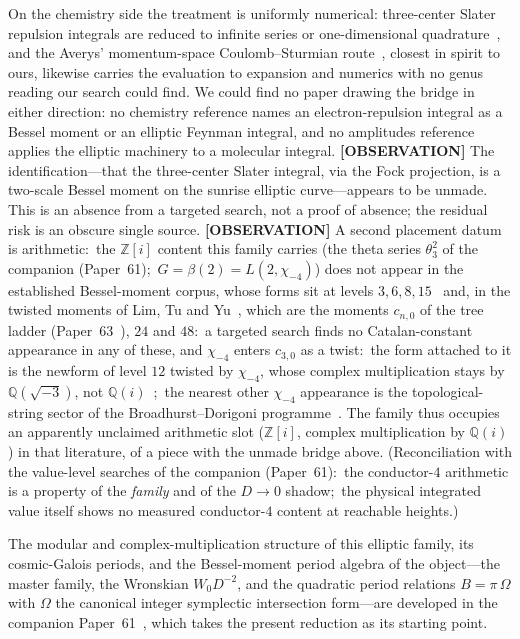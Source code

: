 \documentclass[aps,pra,twocolumn,superscriptaddress,longbibliography]{revtex4-2}
\begin{document}
On the chemistry side the treatment is uniformly numerical: three-center
Slater repulsion integrals are reduced to infinite series or one-dimensional
quadrature~\cite{ozdogan2012,barnett_coulson1951}, and the Averys'
momentum-space Coulomb--Sturmian route~\cite{avery_avery_4center,avery2013}, closest in
spirit to ours, likewise carries the evaluation to expansion and numerics with no
genus reading our search could find.  We could find no
paper drawing the bridge in either direction: no chemistry reference names an
electron-repulsion integral as a Bessel moment or an elliptic Feynman
integral, and no amplitudes reference applies the elliptic machinery to a
molecular integral.  \textbf{[OBSERVATION]} The identification---that the
three-center Slater integral, via the Fock projection, is a two-scale Bessel
moment on the sunrise elliptic curve---appears to be unmade.  This is an
absence from a targeted search, not a proof of absence; the residual risk is
an obscure single source.  \textbf{[OBSERVATION]} A second placement datum is
arithmetic:\ the $\mathbb{Z}[i]$ content this family carries (the theta
series $\theta_{3}^{2}$ of the companion (Paper~61);\ $G=\beta(2)=
L(2,\chi_{-4})$) does not appear in the established
Bessel-moment corpus, whose forms sit at levels $3, 6, 8,
15$~\cite{broadhurst2016,fresansabbahyu2023,zhou_wick2018} and, in the twisted
moments of Lim, Tu and Yu~\cite{lim_tu_yu2026}, which are the moments
$c_{n,0}$ of the tree ladder (Paper~63~\cite{loutey_paper63}), $24$ and $48$:\ a targeted search
finds no Catalan-constant appearance in any of these, and $\chi_{-4}$ enters
$c_{3,0}$ as a twist:\ the form attached to it is the newform of level $12$
twisted by $\chi_{-4}$, whose complex multiplication stays by
$\mathbb{Q}(\sqrt{-3})$, not $\mathbb{Q}(i)$~\cite{lmfdb};\ the nearest other $\chi_{-4}$
appearance is the topological-string sector of the Broadhurst--Dorigoni
programme~\cite{broadhurst_dorigoni2026}.  The family thus occupies an
apparently unclaimed arithmetic slot ($\mathbb{Z}[i]$, complex multiplication by $\mathbb{Q}(i)$) in that literature, of a
piece with the unmade bridge above.  (Reconciliation with the value-level searches of
the companion (Paper~61):\ the conductor-$4$ arithmetic is a property of the \emph{family} and of the
$D\to0$ shadow;\ the physical integrated value itself shows no measured conductor-$4$
content at reachable heights.)

The modular and complex-multiplication structure of this elliptic family, its
cosmic-Galois periods, and the Bessel-moment period algebra of the
object---the master family, the Wronskian $W_{0}D^{-2}$, and the quadratic
period relations $B=\pi\,\Omega$ with $\Omega$ the canonical integer
symplectic intersection form---are developed in the companion
Paper~61~\cite{loutey_paper61}, which takes the present reduction as its
starting point.
\end{document}
